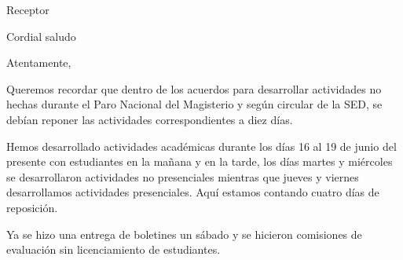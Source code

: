 \documentclass[letterpaper,spanish]{letter}
\begin{document}
\begin{letter}{Receptor}
	
\opening{Cordial saludo}

\closing{Atentamente,}
Queremos recordar que dentro de los acuerdos para desarrollar actividades no hechas durante el Paro Nacional del Magisterio y según circular de la SED, se debían reponer las actividades correspondientes a diez días.

Hemos desarrollado actividades académicas durante los días 16 al 19 de junio del presente con estudiantes en la mañana y en la tarde, los días martes y miércoles se desarrollaron actividades no presenciales mientras que jueves y viernes desarrollamos actividades presenciales. Aquí estamos contando cuatro días de reposición.

Ya se hizo una entrega de boletines un sábado y se hicieron comisiones de evaluación sin licenciamiento de estudiantes.


\end{letter}
\end{document}

